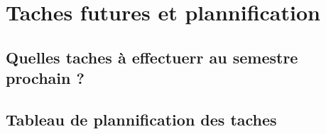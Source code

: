 \chapter{Taches futures et plannification}
\section{Quelles taches à effectuerr au semestre prochain ?}
\section{Tableau de plannification des taches}